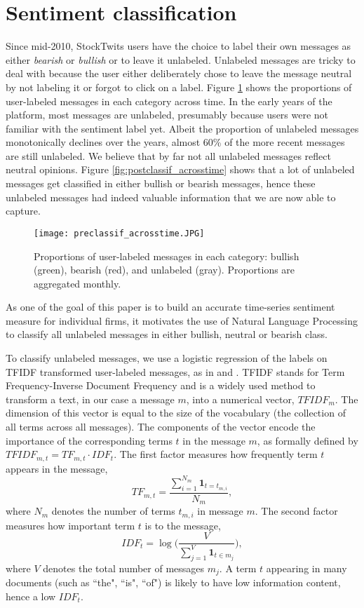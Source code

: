 \section{Sentiment classification}\label{S:classification}

Since mid-2010, StockTwits users have the choice to label their own messages as either \textit{bearish} or \textit{bullish} or to leave it unlabeled. Unlabeled messages are tricky to deal with because the user either deliberately chose to leave the message neutral by not labeling it or forgot to click on a label. Figure \ref{fig:ts_neutral_vs_uncl} shows the proportions of user-labeled messages in each category across time. In the early years of the platform, most messages are unlabeled, presumably because users were not familiar with the sentiment label yet. Albeit the proportion of unlabeled messages monotonically declines over the years, almost 60\% of the more recent messages are still unlabeled. We believe that by far not all unlabeled messages reflect neutral opinions. Figure \ref{fig:postclassif_acrosstime} shows that a lot of unlabeled messages get classified in either bullish or bearish messages, hence these unlabeled messages had indeed valuable information that we are now able to capture. 

\begin{figure}[h]
    \centering
    \texttt{[image: preclassif\_acrosstime.JPG]}
    \caption{Proportions of user-labeled messages in each category: bullish (green), bearish (red), and unlabeled (gray). Proportions are aggregated monthly.}
    \label{fig:ts_neutral_vs_uncl}
\end{figure}


As one of the goal of this paper is to build an accurate time-series sentiment measure for individual firms, it motivates the use of Natural Language Processing to classify all unlabeled messages in either bullish, neutral or bearish class.

To classify unlabeled messages, we use a logistic regression of the labels on TFIDF transformed user-labeled messages, as in \citet{nlp1} and \citet{classifq}. TFIDF stands for Term Frequency-Inverse Document Frequency and is a widely used method to transform a text, in our case a message $m$, into a numerical vector, $TFIDF_m$. The dimension of this vector is equal to the size of the vocabulary (the collection of all terms across all messages). The components of the vector encode the importance of the corresponding terms $t$ in the message $m$, as formally defined by $TFIDF_{m,t} = TF_{m,t} \cdot IDF_t$. The first factor measures how frequently term $t$ appears in the message,
\[ TF_{m,t} =\dfrac{\sum_{i=1}^{N_m} \textbf{1}_{t=t_{m,i}}}{N_m},\]
where $N_m$ denotes the number of terms $t_{m,i}$ in message $m$. The second factor measures how important term $t$ is to the message,
\[ IDF_t = \log \big(\dfrac{V}{\sum_{j=1}^{V} \textbf{1}_{t \in m_j}}\big),\]
where $V$ denotes the total number of messages $m_j$. A term $t$ appearing in many documents (such as ``the", ``is", ``of") is likely to have low information content, hence a low $IDF_t$. 

